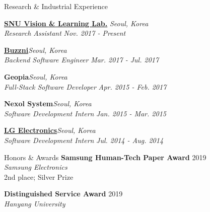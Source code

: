 \documentclass{resume} %
\begin{document}

\begin{rSection}{Research \& Industrial Experience}

{\bf \href{https://vision.snu.ac.kr/}{SNU Vision \& Learning Lab.}} \hfill{\em Seoul, Korea} \\
\textit{Research Assistant} \hfill{\em Nov. 2017 - Present}

{\bf \href{https://www.buzzni.com/}{Buzzni}}\hfill{\em Seoul, Korea} \\
\textit{Backend Software Engineer} \hfill{\em Mar. 2017 - Jul. 2017}

{\bf Geopia}\hfill{\em Seoul, Korea}\\
\textit{Full-Stack Software Developer} \hfill{\em Apr. 2015 - Feb. 2017}

{\bf Nexol System}\hfill{\em Seoul, Korea}\\
\textit{Software Development Intern} \hfill{\em Jan. 2015 - Mar. 2015}

{\bf \href{https://www.lg.com/us}{LG Electronics}}\hfill{\em Seoul, Korea}\\
\textit{Software Development Intern} \hfill{\em Jul. 2014 - Aug. 2014}

\end{rSection}


\begin{rSection}{Honors \& Awards}
	{\bf Samsung Human-Tech Paper Award} \hfill{2019}\\
	\textit{Samsung Electronics}\\
	2nd place; Silver Prize
	
	{\bf Distinguished Service Award} \hfill{2019}\\
	\textit{Hanyang University}
\end{rSection}

\newpage

\end{document}

